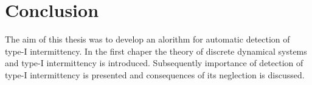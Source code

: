 \chapter{Conclusion}

The aim of this thesis was to develop an alorithm for automatic detection of type-I intermittency.
In the first chaper the theory of discrete dynamical systems and type-I intermittency is introduced.
Subsequently importance of detection of type-I intermittency is presented and consequences of its neglection is discussed.

\endinput